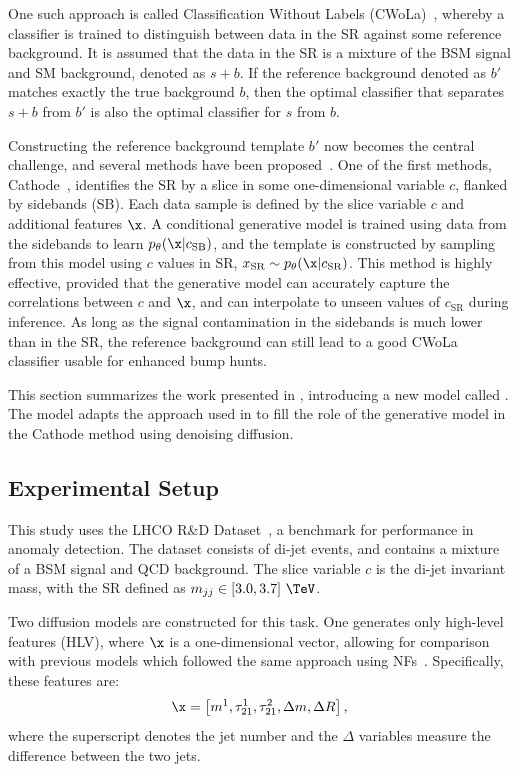 One such approach is called Classification Without Labels (CWoLa)~\cite{cwola}, whereby a classifier is trained to distinguish between data in the SR against some reference background.
It is assumed that the data in the SR is a mixture of the BSM signal and SM background, denoted as $s+b$.
If the reference background denoted as $b'$ matches exactly the true background $b$, then the optimal classifier that separates $s+b$ from $b'$ is also the optimal classifier for $s$ from $b$.

Constructing the reference background template $b'$ now becomes the central challenge, and several methods have been proposed~\cite{cathode, salad, CURTAINs, feta, lacathode}.
One of the first methods, Cathode~\cite{cathode}, identifies the SR by a slice in some one-dimensional variable $c$, flanked by sidebands (SB).
Each data sample is defined by the slice variable $c$ and additional features $\x$.
A conditional generative model is trained using data from the sidebands to learn $p_\theta(\x|c_{\text{SB}})$, and the template is constructed by sampling from this model using $c$ values in SR, $x_{\text{SR}} \sim p_\theta(\x|c_{\text{SR}})$.
This method is highly effective, provided that the generative model can accurately capture the correlations between $c$ and $\x$, and can interpolate to unseen values of $c_\text{SR}$ during inference.
As long as the signal contamination in the sidebands is much lower than in the SR, the reference background can still lead to a good CWoLa classifier usable for enhanced bump hunts.

This section summarizes the work presented in \textcite{Drapes}, introducing a new model called \drapes.
The \drapes model adapts the approach used in \pcdroid to fill the role of the generative model in the Cathode method using denoising diffusion.

\subsection{Experimental Setup}

This study uses the LHCO R\&D Dataset~\cite{LHCO}, a benchmark for performance in anomaly detection.
The dataset consists of di-jet events, and contains a mixture of a BSM signal and QCD background.
The slice variable $c$ is the di-jet invariant mass, with the SR defined as $m_{jj} \in [3.0, 3.7]~\TeV$.

Two diffusion models are constructed for this task.
One generates only high-level features (\drapes HLV), where $\x$ is a one-dimensional vector, allowing for comparison with previous models which followed the same approach using NFs~\cite{cathode, CURTAINs, lacathode}.
Specifically, these features are:
\begin{equation}
    \x = \left[ m^{1}, \tau_{21}^{1}, \tau_{21}^{2}, \Delta m, \Delta R \right],
\end{equation}
where the superscript denotes the jet number and the $\Delta$ variables measure the difference between the two jets.

